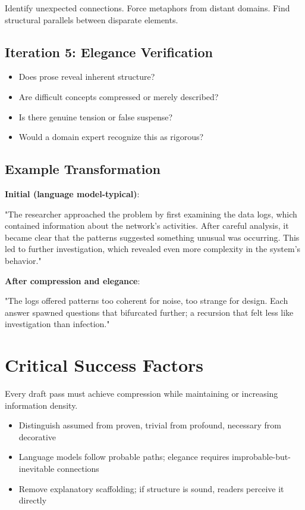 Identify unexpected connections. Force metaphors from distant domains. Find structural parallels between disparate elements.

\subsection*{Iteration 5: Elegance Verification}

\begin{itemize}
\item Does prose reveal inherent structure?
\item Are difficult concepts compressed or merely described?
\item Is there genuine tension or false suspense?
\item Would a domain expert recognize this as rigorous?
\end{itemize}

\subsection*{Example Transformation}

\textbf{Initial (language model-typical)}:

"The researcher approached the problem by first examining the data logs, which contained information about the network's activities. After careful analysis, it became clear that the patterns suggested something unusual was occurring. This led to further investigation, which revealed even more complexity in the system's behavior."

\textbf{After compression and elegance}:

"The logs offered patterns too coherent for noise, too strange for design. Each answer spawned questions that bifurcated further; a recursion that felt less like investigation than infection."

\section*{Critical Success Factors}

Every draft pass must achieve compression while maintaining or increasing information density. 

\begin{itemize}
\item Distinguish assumed from proven, trivial from profound, necessary from decorative
\item Language models follow probable paths; elegance requires improbable-but-inevitable connections
\item Remove explanatory scaffolding; if structure is sound, readers perceive it directly
\end{itemize}

